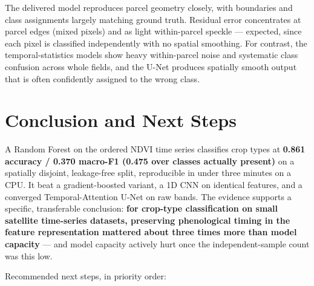\documentclass[11pt,a4paper]{article}
\begin{document}
The delivered model reproduces parcel geometry closely, with boundaries and
class assignments largely matching ground truth. Residual error concentrates at
parcel edges (mixed pixels) and as light within-parcel speckle --- expected,
since each pixel is classified independently with no spatial smoothing. For
contrast, the temporal-statistics models show heavy within-parcel noise and
systematic class confusion across whole fields, and the U-Net produces spatially
smooth output that is often confidently assigned to the wrong class.

\section{Conclusion and Next Steps}\label{sec:conclusion}

A Random Forest on the ordered NDVI time series classifies crop types at
\textbf{0.861 accuracy / 0.370 macro-F1 (0.475 over classes actually present)}
on a spatially disjoint, leakage-free split, reproducible in under three minutes
on a CPU. It beat a gradient-boosted variant, a 1D CNN on identical features,
and a converged Temporal-Attention U-Net on raw bands. The evidence supports a
specific, transferable conclusion: \textbf{for crop-type classification on small
satellite time-series datasets, preserving phenological timing in the feature
representation mattered about three times more than model capacity} --- and
model capacity actively hurt once the independent-sample count was this low.

Recommended next steps, in priority order:
\end{document}
